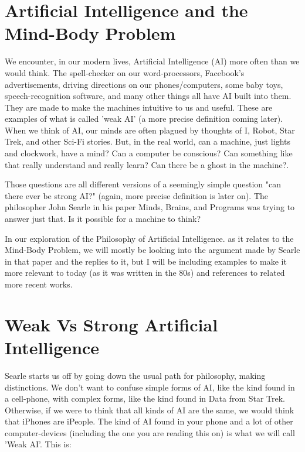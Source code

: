 \section{Artificial Intelligence and the Mind-Body Problem}
We encounter, in our modern lives, Artificial Intelligence (AI) more often than we would think. The spell-checker on our word-processors, Facebook's advertisements, driving directions on our phones/computers, some baby toys, speech-recognition software, and many other things all have AI built into them. They are made to make the machines intuitive to us and useful. These are examples of what is called 'weak AI' (a more precise definition coming later). When we think of AI, our minds are often plagued by thoughts of I, Robot, Star Trek, and other Sci-Fi stories. But, in the real world, can a machine, just lights and clockwork, have a mind? Can a computer be conscious? Can something like that really understand and really learn? Can there be a ghost in the machine?.

Those questions are all different versions of a seemingly simple question "can there ever be strong AI?" (again, more precise definition is later on). The philosopher John Searle in his paper Minds, Brains, and Programs was trying to answer just that. Is it possible for a machine to think?

In our exploration of the Philosophy of Artificial Intelligence\autocite{SEPAI}. as it relates to the Mind-Body Problem, we will mostly be looking into the argument made by Searle in that paper and the replies to it, but I will be including examples to make it more relevant to today (as it was written in the 80s) and references to related more recent works.

\section{Weak Vs Strong Artificial Intelligence}

Searle starts us off by going down the usual path for philosophy, making distinctions. We don't want to confuse simple forms of AI, like the kind found in a cell-phone, with complex forms, like the kind found in Data from Star Trek. Otherwise, if we were to think that all kinds of AI are the same, we would think that iPhones are iPeople. The kind of AI found in your phone and a lot of other computer-devices (including the one you are reading this on) is what we will call 'Weak AI'. This is:


